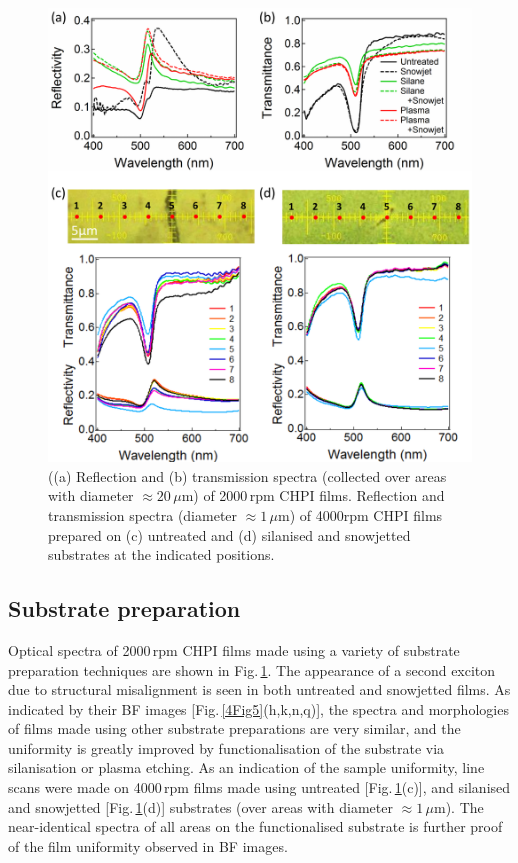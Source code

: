 \begin{figure}[] 
\centering    
\includegraphics[width=\textwidth]{Fig7}
\caption{((a) Reflection and (b) transmission spectra (collected over areas with diameter $\approx 20\,\mu$m) of 2000\,rpm CHPI films. Reflection and transmission spectra (diameter $\approx1\,\mu$m) of 4000rpm CHPI films prepared on (c) untreated and (d) silanised and snowjetted substrates at the indicated positions.}
\label{4Fig7}
\end{figure}
\subsection{Substrate preparation}
Optical spectra of 2000\,rpm CHPI films made using a variety of substrate preparation techniques are shown in Fig.\,\ref{4Fig7}. The appearance of a second exciton due to structural misalignment is seen in both untreated and snowjetted films. As indicated by their BF images [Fig.\,\ref{4Fig5}(h,k,n,q)], the spectra and morphologies of films made using other substrate preparations are very similar, and the uniformity is greatly improved by functionalisation of the substrate via silanisation or plasma etching. As an indication of the sample uniformity, line scans were made on 4000\,rpm films made using untreated [Fig.\,\ref{4Fig7}(c)], and silanised and snowjetted [Fig.\,\ref{4Fig7}(d)] substrates (over areas with diameter $\approx1\,\mu$m). The near-identical spectra of all areas on the functionalised substrate is further proof of the film uniformity observed in BF images.

